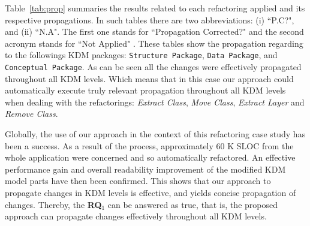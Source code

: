 Table~\ref{tab:prop} summaries the results related to each refactoring applied and its respective propagations. In such tables there are two abbreviations: (i) ``P.C?", and (ii) ``N.A". The first one stands for ``Propagation Corrected?" and the second acronym stands for ``Not Applied" . These tables show the propagation regarding to the followings KDM packages: \texttt{Structure Package}, \texttt{Data Package}, and \texttt{Conceptual Package}. As can be seen all the changes were effectively propagated throughout all KDM levels. Which means that in this case our approach could automatically execute truly relevant propagation throughout all KDM levels when dealing with the refactorings: \textit{Extract Class}, \textit{Move Class}, \textit{Extract Layer} and \textit{Remove Class}. 

Globally, the use of our approach in the context of this refactoring case study has been a success. As a result of the process, approximately 60 K SLOC from the whole application were concerned and so automatically refactored. An effective performance gain and overall readability improvement of the modified KDM model parts have then been confirmed.  This shows that our approach to propagate changes in KDM levels is effective, and yields concise propagation of changes. Thereby, the \textbf{RQ$_1$} can be answered as true, that is, the proposed approach can propagate changes effectively throughout all KDM levels.

